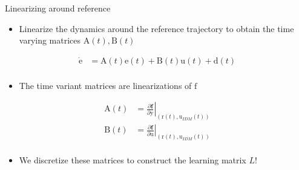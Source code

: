 \documentclass[handout]{beamer}
\newcommand{\boldvec}[1]{\boldsymbol{\mathrm{#1}}}
\let\vec\boldvec
\newcommand\at[2]{\left.#1\right|_{#2}} %
\newcommand{\state}{\vec{y}} %
\newcommand{\error}{\vec{e}} %
\newcommand{\traj}{\vec{r}} %
\newcommand{\linDist}{\vec{d}} %
\newcommand{\sysInput}{\vec{u}} %
\newcommand{\dynamics}{\vec{f}}
\begin{document}
%
\begin{frame}{Linearizing around reference}
\begin{itemize}
\item Linearize the dynamics around the reference trajectory to obtain the time varying matrices $\vec{A}(t), \vec{B}(t)$
\end{itemize}
\begin{equation*}
\begin{aligned}
\dot{\error} &= \vec{A}(t)\error(t) + \vec{B}(t)\sysInput(t) + \linDist(t)\\
\end{aligned}
\end{equation*} 
\begin{itemize}
\item The time variant matrices are linearizations of $\dynamics$ 
\end{itemize}
\begin{equation*}
\begin{aligned}
\vec{A}(t) & = \at{\frac{\partial{\mathbf{f}}}{\partial{\state}}}{(\traj(t),\sysInput_{IDM}(t))} \\
\vec{B}(t) & = \at{\frac{\partial{\mathbf{f}}}{\partial{\sysInput}}}{(\traj(t),\sysInput_{IDM}(t))} \\
\end{aligned}
\end{equation*}
\begin{itemize}
\item We discretize these matrices to construct the learning matrix $L$! 
\end{itemize}
\end{frame}
\end{document}
